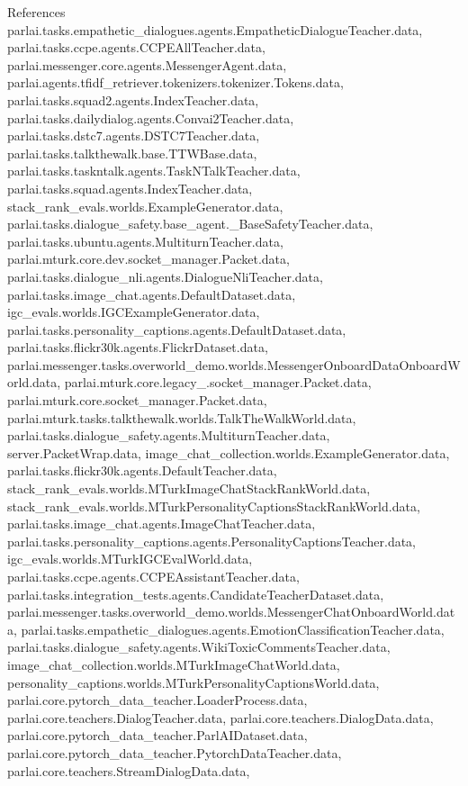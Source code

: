 References parlai.\+tasks.\+empathetic\+\_\+dialogues.\+agents.\+Empathetic\+Dialogue\+Teacher.\+data, parlai.\+tasks.\+ccpe.\+agents.\+C\+C\+P\+E\+All\+Teacher.\+data, parlai.\+messenger.\+core.\+agents.\+Messenger\+Agent.\+data, parlai.\+agents.\+tfidf\+\_\+retriever.\+tokenizers.\+tokenizer.\+Tokens.\+data, parlai.\+tasks.\+squad2.\+agents.\+Index\+Teacher.\+data, parlai.\+tasks.\+dailydialog.\+agents.\+Convai2\+Teacher.\+data, parlai.\+tasks.\+dstc7.\+agents.\+D\+S\+T\+C7\+Teacher.\+data, parlai.\+tasks.\+talkthewalk.\+base.\+T\+T\+W\+Base.\+data, parlai.\+tasks.\+taskntalk.\+agents.\+Task\+N\+Talk\+Teacher.\+data, parlai.\+tasks.\+squad.\+agents.\+Index\+Teacher.\+data, stack\+\_\+rank\+\_\+evals.\+worlds.\+Example\+Generator.\+data, parlai.\+tasks.\+dialogue\+\_\+safety.\+base\+\_\+agent.\+\_\+\+Base\+Safety\+Teacher.\+data, parlai.\+tasks.\+ubuntu.\+agents.\+Multiturn\+Teacher.\+data, parlai.\+mturk.\+core.\+dev.\+socket\+\_\+manager.\+Packet.\+data, parlai.\+tasks.\+dialogue\+\_\+nli.\+agents.\+Dialogue\+Nli\+Teacher.\+data, parlai.\+tasks.\+image\+\_\+chat.\+agents.\+Default\+Dataset.\+data, igc\+\_\+evals.\+worlds.\+I\+G\+C\+Example\+Generator.\+data, parlai.\+tasks.\+personality\+\_\+captions.\+agents.\+Default\+Dataset.\+data, parlai.\+tasks.\+flickr30k.\+agents.\+Flickr\+Dataset.\+data, parlai.\+messenger.\+tasks.\+overworld\+\_\+demo.\+worlds.\+Messenger\+Onboard\+Data\+Onboard\+World.\+data, parlai.\+mturk.\+core.\+legacy\+\_.\+socket\+\_\+manager.\+Packet.\+data, parlai.\+mturk.\+core.\+socket\+\_\+manager.\+Packet.\+data, parlai.\+mturk.\+tasks.\+talkthewalk.\+worlds.\+Talk\+The\+Walk\+World.\+data, parlai.\+tasks.\+dialogue\+\_\+safety.\+agents.\+Multiturn\+Teacher.\+data, server.\+Packet\+Wrap.\+data, image\+\_\+chat\+\_\+collection.\+worlds.\+Example\+Generator.\+data, parlai.\+tasks.\+flickr30k.\+agents.\+Default\+Teacher.\+data, stack\+\_\+rank\+\_\+evals.\+worlds.\+M\+Turk\+Image\+Chat\+Stack\+Rank\+World.\+data, stack\+\_\+rank\+\_\+evals.\+worlds.\+M\+Turk\+Personality\+Captions\+Stack\+Rank\+World.\+data, parlai.\+tasks.\+image\+\_\+chat.\+agents.\+Image\+Chat\+Teacher.\+data, parlai.\+tasks.\+personality\+\_\+captions.\+agents.\+Personality\+Captions\+Teacher.\+data, igc\+\_\+evals.\+worlds.\+M\+Turk\+I\+G\+C\+Eval\+World.\+data, parlai.\+tasks.\+ccpe.\+agents.\+C\+C\+P\+E\+Assistant\+Teacher.\+data, parlai.\+tasks.\+integration\+\_\+tests.\+agents.\+Candidate\+Teacher\+Dataset.\+data, parlai.\+messenger.\+tasks.\+overworld\+\_\+demo.\+worlds.\+Messenger\+Chat\+Onboard\+World.\+data, parlai.\+tasks.\+empathetic\+\_\+dialogues.\+agents.\+Emotion\+Classification\+Teacher.\+data, parlai.\+tasks.\+dialogue\+\_\+safety.\+agents.\+Wiki\+Toxic\+Comments\+Teacher.\+data, image\+\_\+chat\+\_\+collection.\+worlds.\+M\+Turk\+Image\+Chat\+World.\+data, personality\+\_\+captions.\+worlds.\+M\+Turk\+Personality\+Captions\+World.\+data, parlai.\+core.\+pytorch\+\_\+data\+\_\+teacher.\+Loader\+Process.\+data, parlai.\+core.\+teachers.\+Dialog\+Teacher.\+data, parlai.\+core.\+teachers.\+Dialog\+Data.\+data, parlai.\+core.\+pytorch\+\_\+data\+\_\+teacher.\+Parl\+A\+I\+Dataset.\+data, parlai.\+core.\+pytorch\+\_\+data\+\_\+teacher.\+Pytorch\+Data\+Teacher.\+data, parlai.\+core.\+teachers.\+Stream\+Dialog\+Data.\+data, 
